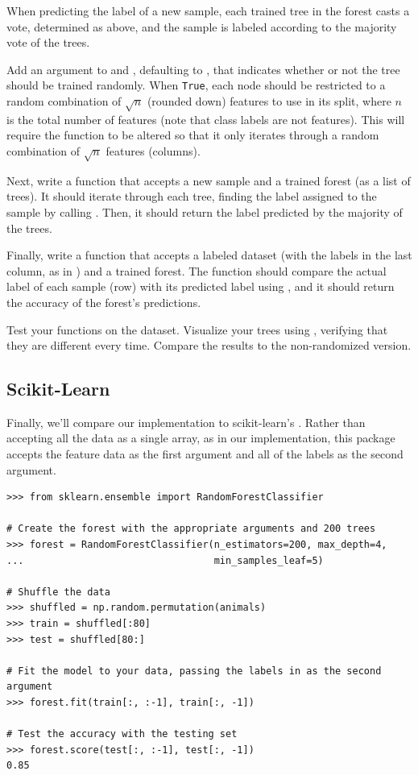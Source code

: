 When predicting the label of a new sample, each trained tree in the forest casts a vote, determined as above, and the sample is labeled according to the majority vote of the trees.

\begin{problem}
Add an argument  to  and , defaulting to , that indicates whether or not the tree should be trained randomly.
When \texttt{True}, each node should be restricted to a random combination of $\sqrt{n}$ (rounded down) features to use in its split, where $n$ is the total number of features (note that class labels are not features).
This will require the function  to be altered so that it only iterates through a random combination of $\sqrt{n}$ features (columns).

Next, write a function  that accepts a new sample and a trained forest (as a list of trees).
It should iterate through each tree, finding the label assigned to the sample by calling .
Then, it should return the label predicted by the majority of the trees.

Finally, write a function  that accepts a labeled dataset (with the labels in the last column, as in ) and a trained forest.
The function should compare the actual label of each sample (row) with its predicted label using , and it should return the accuracy of the forest's predictions.

Test your functions on the  dataset.
Visualize your trees using , verifying that they are different every time.
Compare the results to the non-randomized version.
\end{problem}

\subsection*{Scikit-Learn}

Finally, we'll compare our implementation to scikit-learn's .
Rather than accepting all the data as a single array, as in our implementation, this package accepts the feature data as the first argument and all of the labels as the second argument.

\begin{lstlisting}
>>> from sklearn.ensemble import RandomForestClassifier

# Create the forest with the appropriate arguments and 200 trees
>>> forest = RandomForestClassifier(n_estimators=200, max_depth=4,
...									min_samples_leaf=5)

# Shuffle the data
>>> shuffled = np.random.permutation(animals)
>>> train = shuffled[:80]
>>> test = shuffled[80:]

# Fit the model to your data, passing the labels in as the second argument
>>> forest.fit(train[:, :-1], train[:, -1])

# Test the accuracy with the testing set
>>> forest.score(test[:, :-1], test[:, -1])
0.85
\end{lstlisting}

